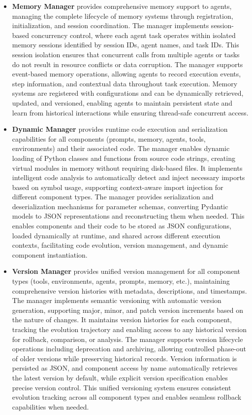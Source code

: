 \documentclass[11pt]{article}
\begin{document}
\begin{itemize}[leftmargin=*,itemsep=0.1em]
\item \textbf{Memory Manager} provides comprehensive memory support to agents, managing the complete lifecycle of memory systems through registration, initialization, and session coordination. The manager implements session-based concurrency control, where each agent task operates within isolated memory sessions identified by session IDs, agent names, and task IDs. This session isolation ensures that concurrent calls from multiple agents or tasks do not result in resource conflicts or data corruption. The manager supports event-based memory operations, allowing agents to record execution events, step information, and contextual data throughout task execution. Memory systems are registered with configurations and can be dynamically retrieved, updated, and versioned, enabling agents to maintain persistent state and learn from historical interactions while ensuring thread-safe concurrent access.

\item \textbf{Dynamic Manager} provides runtime code execution and serialization capabilities for all components (prompts, memory, agents, tools, environments) and their associated code. The manager enables dynamic loading of Python classes and functions from source code strings, creating virtual modules in memory without requiring disk-based files. It implements intelligent code analysis to automatically detect and inject necessary imports based on symbol usage, supporting context-aware import injection for different component types. The manager provides serialization and deserialization mechanisms for parameter schemas, converting Pydantic models to JSON representations and reconstructing them when needed. This enables components and their code to be stored as JSON configurations, loaded dynamically at runtime, and shared across different execution contexts, facilitating code evolution, version management, and dynamic component instantiation.

\item \textbf{Version Manager} provides unified version management for all component types (tools, environments, agents, prompts, memory, etc.), maintaining comprehensive version histories with metadata, descriptions, and timestamps. The manager implements semantic versioning with automatic version generation, supporting major, minor, and patch version increments based on the nature of changes. It maintains version histories for each component, tracking the evolution trajectory and enabling access to any historical version for rollback, comparison, or analysis. The manager supports version lifecycle operations including deprecation and archiving, allowing controlled phase-out of older versions while preserving historical records. Version information is persisted as JSON, and component access by name automatically retrieves the latest version by default, while explicit version specification enables precise version control. This unified versioning system ensures consistent evolution tracking across all component types and enables seamless rollback capabilities when needed.


\end{itemize}
\end{document}
